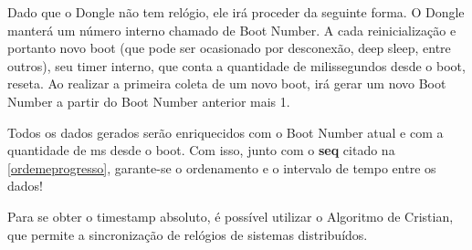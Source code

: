 \documentclass[12pt]{article}
\begin{document}
Dado que o Dongle não tem relógio, ele irá proceder da seguinte forma. O Dongle manterá um número interno chamado de Boot Number. A cada reinicialização e portanto novo boot (que pode ser ocasionado por desconexão, deep sleep, entre outros), seu timer interno, que conta a quantidade de milissegundos desde o boot, reseta. Ao realizar a primeira coleta de um novo boot, irá gerar um novo Boot Number a partir do Boot Number anterior mais 1. 

Todos os dados gerados serão enriquecidos com o Boot Number atual e com a quantidade de ms desde o boot. Com isso, junto com o \textbf{seq} citado na \autoref{ordemeprogresso}, garante-se o ordenamento e o intervalo de tempo entre os dados!

Para se obter o timestamp absoluto, é possível utilizar o Algoritmo de Cristian, que permite a sincronização de relógios de sistemas distribuídos. 
\end{document}
